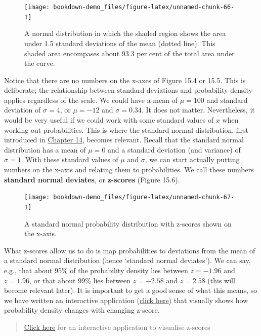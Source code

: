 \documentclass[
]{scrbook}
\begin{document}
\begin{figure}
\texttt{[image: bookdown-demo\_files/figure-latex/unnamed-chunk-66-1]} \caption{A normal distribution in which the shaded region shows the area under 1.5 standard deviations of the mean (dotted line). This shaded area encompases about 93.3 per cent of the total area under the curve.}\label{fig:unnamed-chunk-66}
\end{figure}

Notice that there are no numbers on the x-axes of Figure 15.4 or 15.5.
This is deliberate; the relationship between standard deviations and probability density applies regardless of the scale.
We could have a mean of \(\mu = 100\) and standard deviation of \(\sigma = 4\), or \(\mu = -12\) and \(\sigma = 0.34\).
It does not matter.
Nevertheless, it would be very useful if we could work with some standard values of \(x\) when working out probabilities.
This is where the standard normal distribution, first introduced in \protect\hyperlink{Chapter_14}{Chapter 14}, becomes relevant.
Recall that the standard normal distribution has a mean of \(\mu = 0\) and a standard deviation (and variance) of \(\sigma = 1\).
With these standard values of \(\mu\) and \(\sigma\), we can start actually putting numbers on the x-axis and relating them to probabilities.
We call these numbers \textbf{standard normal deviates}, or \textbf{z-scores} (Figure 15.6).

\begin{figure}
\texttt{[image: bookdown-demo\_files/figure-latex/unnamed-chunk-67-1]} \caption{A standard normal probability distribution with z-scores shown on the x-axis.}\label{fig:unnamed-chunk-67}
\end{figure}

What z-scores allow us to do is map probabilities to deviations from the mean of a standard normal distribution (hence `standard normal deviates').
We can say, e.g., that about 95\% of the probability density lies between \(z = -1.96\) and \(z = 1.96\), or that about 99\% lies between \(z = -2.58\) and \(z = 2.58\) (this will become relevant later).
It is important to get a good sense of what this means, so we have written an interactive application (\href{https://bradduthie.shinyapps.io/zandp/}{click here}) that visually shows how probability density changes with changing z-score.

\begin{quote}
\href{https://bradduthie.shinyapps.io/zandp/}{Click here} for an interactive application to visualise z-scores
\end{quote}
\end{document}
